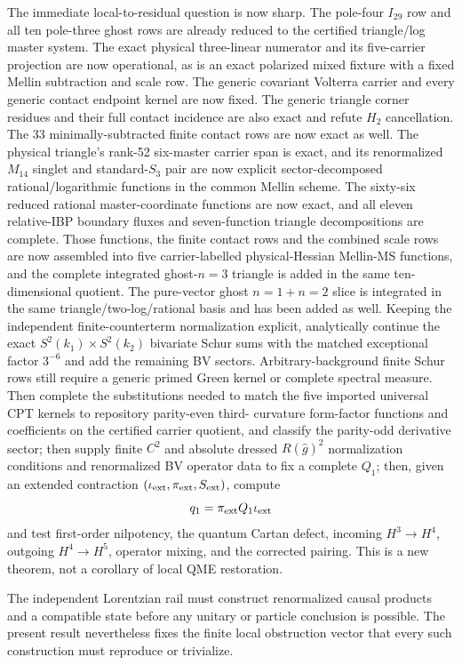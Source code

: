 \documentclass[11pt]{article}
\theoremstyle{definition}
\theoremstyle{remark}
\begin{document}
The immediate local-to-residual question is now sharp.  The pole-four
$I_{29}$ row and all ten pole-three ghost rows are already reduced to the
certified triangle/log master system.  The exact physical three-linear
numerator and its five-carrier projection are now operational, as is an
exact polarized mixed fixture with a fixed Mellin subtraction and scale row.
The generic covariant Volterra carrier and every generic contact endpoint
kernel are now fixed.  The generic triangle corner residues and their full
contact incidence are also exact and refute $H_2$ cancellation.  The 33
minimally-subtracted finite contact rows are now exact as well.  The physical
triangle's rank-52 six-master carrier span is exact, and its renormalized
$M_{14}$ singlet and standard-$S_3$ pair are now explicit sector-decomposed
rational/logarithmic functions in the common Mellin scheme.  The sixty-six
reduced rational master-coordinate functions are now exact, and all eleven
relative-IBP boundary fluxes and seven-function triangle decompositions are
complete.  Those functions, the finite contact rows and the combined scale
rows are now assembled into five carrier-labelled physical-Hessian
Mellin-MS functions, and the complete integrated ghost-$n=3$ triangle is
added in the same ten-dimensional quotient.  The pure-vector ghost
$n=1+n=2$ slice is integrated in the same triangle/two-log/rational basis and
has been added as well.  Keeping the independent finite-counterterm
normalization explicit, analytically continue the exact
$S^2(k_1)\times S^2(k_2)$ bivariate Schur sums with the matched exceptional
factor $3^{-6}$ and add the remaining BV sectors.  Arbitrary-background
finite Schur rows still require a generic primed Green kernel or complete
spectral measure.  Then complete the
substitutions needed to match
the five imported universal CPT kernels to repository parity-even third-
curvature form-factor functions and coefficients on the certified carrier
quotient, and classify the parity-odd derivative
sector; then supply finite $C^2$
and absolute dressed $R(\widehat g)^2$ normalization conditions and
renormalized BV operator data to fix a complete $Q_1$; then, given an extended
contraction $(\iota_{\rm ext},\pi_{\rm ext},S_{\rm ext})$, compute
\[
 q_1=\pi_{\rm ext}Q_1\iota_{\rm ext}
\]
and test first-order nilpotency, the quantum Cartan defect, incoming
$H^3\to H^4$, outgoing $H^4\to H^5$, operator mixing, and the corrected
pairing.  This is a new theorem, not a corollary of local QME restoration.

The independent Lorentzian rail must construct renormalized causal products
and a compatible state before any unitary or particle conclusion is possible.
The present result nevertheless fixes the finite local obstruction vector
that every such construction must reproduce or trivialize.
\end{document}
